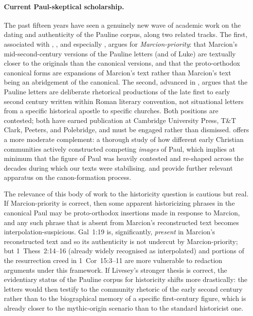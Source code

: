 \documentclass[12pt,oneside]{article}
\begin{document}
\paragraph{Current Paul-skeptical scholarship.}
The past fifteen years have seen a genuinely new wave of academic
work on the dating and authenticity of the Pauline corpus, along two
related tracks.  The first, associated with \citet{BeDuhn2013},
\citet{Klinghardt2015}, and especially \citet{Vinzent2014,Vinzent2023},
argues for \textit{Marcion-priority}: that Marcion's mid-second-century
versions of the Pauline letters (and of Luke) are textually closer to
the originals than the canonical versions, and that the proto-orthodox
canonical forms are expansions of Marcion's text rather than Marcion's
text being an abridgement of the canonical.  The second, advanced in
\citet{Livesey2024}, argues that the Pauline letters are deliberate
rhetorical productions of the late first to early second century
written within Roman literary convention, not situational letters
from a specific historical apostle to specific churches.  Both
positions are contested; both have earned publication at Cambridge
University Press, T\&T Clark, Peeters, and Polebridge, and must be
engaged rather than dismissed.  \citet{White2014} offers a more
moderate complement: a thorough study of how different early Christian
communities actively constructed competing \textit{images} of Paul,
which implies at minimum that the figure of Paul was heavily
contested and re-shaped across the decades during which our texts
were stabilising.  \citet{Trobisch2000} and \citet{Pervo2010} provide
further relevant apparatus on the canon-formation process.

The relevance of this body of work to the historicity question is
cautious but real.  If Marcion-priority is correct, then some
apparent historicizing phrases in the canonical Paul may be
proto-orthodox insertions made in response to Marcion, and any such
phrase that is absent from Marcion's reconstructed text becomes
interpolation-suspicious.  Gal~1:19 is, significantly, \textit{present}
in Marcion's reconstructed text and so its authenticity is not
undercut by Marcion-priority; but 1~Thess~2:14--16 (already widely
recognised as interpolated) and portions of the resurrection creed
in 1~Cor~15:3--11 are more vulnerable to redaction arguments under
this framework.  If Livesey's stronger thesis is correct, the
evidentiary status of the Pauline corpus for historicity shifts more
drastically: the letters would then testify to the community
rhetoric of the early second century rather than to the biographical
memory of a specific first-century figure, which is already closer
to the mythic-origin scenario than to the standard historicist one.
\end{document}
